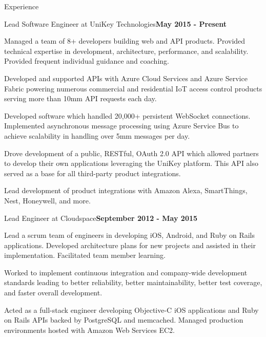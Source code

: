 \documentclass{resume} %
\begin{document}
\begin{rSection}{Experience}


\begin{rSubsection}{Lead Software Engineer at UniKey Technologies}{\bf May 2015 - Present}{}{}

\item Managed a team of 8+ developers building web and API products.  Provided technical expertise in development, architecture,  performance, and scalability.  Provided frequent individual guidance and coaching.
\item Developed and supported APIs with Azure Cloud Services and Azure Service Fabric powering numerous commercial and residential IoT access control products serving more than 10mm API requests each day.
\item Developed software which handled 20,000+ persistent WebSocket connections. Implemented asynchronous message processing using Azure Service Bus to achieve scalability in handling over 5mm messages per day.
\item Drove development of a public, RESTful, OAuth 2.0 API which allowed partners to develop their own applications leveraging the UniKey platform.  This API also served as a base for all third-party product integrations.
\item Lead development of product integrations with Amazon Alexa, SmartThings, Nest, Honeywell, and more.

\end{rSubsection}


\begin{rSubsection}{Lead Engineer at Cloudspace}{\bf September 2012 - May 2015}{}{}

\item Lead a scrum team of engineers in developing iOS, Android, and Ruby on Rails applications.  Developed architecture plans for new projects and assisted in their implementation. Facilitated team member learning.
\item Worked to implement continuous integration and company-wide development standards leading to better reliability, better maintainability, better test coverage, and faster overall development.
\item Acted as a full-stack engineer developing Objective-C iOS applications and Ruby on Rails APIs backed by PostgreSQL and memcached. Managed production environments hosted with Amazon Web Services EC2.


\end{rSubsection}
\end{rSection}
\end{document}
